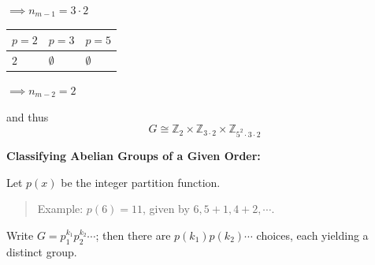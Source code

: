 \(\implies n_{m-1} = 3 \cdot 2\)

\begin{longtable}[]{@{}lll@{}}
\toprule
\(p = 2\) & \(p= 3\) & \(p =5\)\tabularnewline
\midrule
\endhead
\(2\) & \(\emptyset\) & \(\emptyset\)\tabularnewline
\bottomrule
\end{longtable}

\(\implies n_{m-2} = 2\)

and thus \[
G\cong {\mathbb{Z}}_2 \times {\mathbb{Z}}_{3\cdot 2} \times {\mathbb{Z}}_{5^2 \cdot 3 \cdot 2}
\]

\textbf{Classifying Abelian Groups of a Given Order:}

Let \(p(x)\) be the integer partition function.

\begin{quote}
Example: \(p(6) = 11\), given by \(6, 5+1, 4+2, \cdots\).
\end{quote}

Write \(G = p_1^{k_1} p_2^{k_2} \cdots\); then there are
\(p(k_1) p(k_2) \cdots\) choices, each yielding a distinct group.
